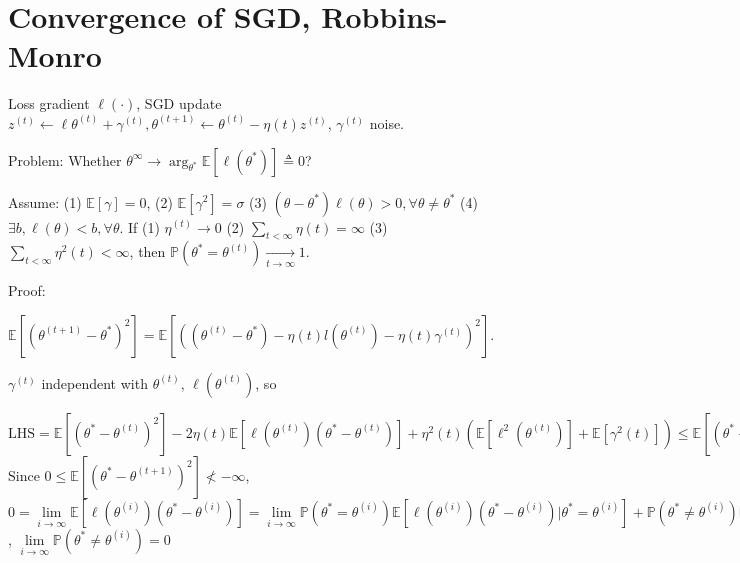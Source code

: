 \section{Convergence of SGD, Robbins-Monro} 
Loss gradient $\ell(\cdot)$, SGD update $z^{(t)} \leftarrow \ell \theta^{(t)}+\gamma^{(t)}, \theta^{(t+1)} \leftarrow \theta^{(t)}-\eta(t) z^{(t)}$, $\gamma^{(t)}$ noise. 

Problem: Whether $\theta^{\infty}\to \arg_{\theta^*}\mathbb{E}[\ell (\theta^*)]\triangleq 0$? 

Assume: (1) $\mathbb{E}[\gamma] = 0$, (2) $\mathbb{E}[\gamma^2] = \sigma$ (3) $\left(\theta-\theta^{*}\right) \ell(\theta)>0,\forall \theta\neq\theta^*$ (4) $\exists b,\ell(\theta) < b,\forall \theta$. If (1) $\eta^{(t)}\to 0$ (2) $\underset{t<\infty}{\sum} \eta(t)=\infty$ (3) $\underset{t<\infty}{\sum} \eta^{2}(t)<\infty$, then $\mathbb{P}\left(\theta^{*}=\theta^{(t)}\right) \underset{t \rightarrow \infty}{\longrightarrow} 1$.

Proof:
\begin{scriptsize}
    $\mathbb{E}[(\theta^{(t+1)}-\theta^{*})^{2}]=\mathbb{E}[((\theta^{(t)}-\theta^{*})-\eta(t) l(\theta^{(t)})-\eta(t) \gamma^{(t)})^2]$.
\end{scriptsize}
$\gamma^{(t)}$ independent with $\theta^{(t)}$, $\ell(\theta^{(t)})$, so 
\begin{scriptsize}
    $\text{LHS}=\mathbb{E}[(\theta^{*}-\theta^{(t)})^{2}]-2 \eta(t) \mathbb{E}[\ell(\theta^{(t)})(\theta^{*}-\theta^{(t)})]+\eta^{2}(t)(\mathbb{E}[\ell^{2}(\theta^{(t)})]+\mathbb{E}[\gamma^{2}(t)]) \leq \mathbb{E}[(\theta^{*}-\theta^{(0)})^{2}]-2\sum_{i\leq t} \eta(i) \mathbb{E}[\ell(\theta^{(i)})(\theta^{*}-\theta^{(i)})]+ \sum_{i \leq t} \eta^{2}(i)\left(b^{2}+\sigma^{2}\right)$
Since 
    $0\leq \mathbb{E}[(\theta^{*}-\theta^{(t+1)})^{2}] \nless-\infty$, $0 =  \underset{i \rightarrow \infty}{\lim} \mathbb{E}[\ell(\theta^{(i)})(\theta^{*}-\theta^{(i)})]= \underset{i \rightarrow \infty}{\lim}\mathbb{P}(\theta^{*}=\theta^{(i)}) \mathbb{E}[\ell(\theta^{(i)})(\theta^{*}-\theta^{(i)}) | \theta^{*}=\theta^{(i)}]+ \mathbb{P}(\theta^{*} \neq \theta^{(i)}) \mathbb{E}[\ell(\theta^{(i)})(\theta^{*}-\theta^{(i)}) | \theta^{*} \neq \theta^{(i)}]$, $\underset{i \rightarrow \infty}{\lim} \mathbb{P}\left(\theta^{*} \neq \theta^{(i)}\right)=0$
\end{scriptsize}

